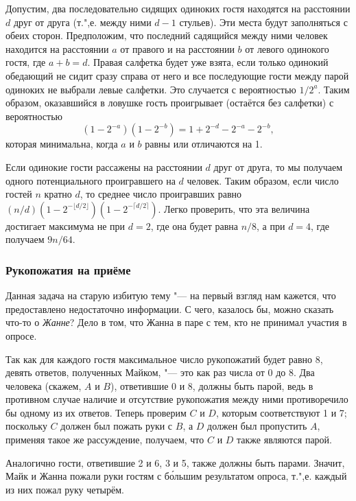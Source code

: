 \documentclass[twoside]{book}
\begin{document}
Допустим, два последовательно сидящих одиноких гостя находятся на расстоянии $d$ друг от друга (т.",е. между ними $d-1$ стульев).
Эти места будут заполняться с обеих сторон.
Предположим, что последний садящийся между ними человек находится на расстоянии $a$ от правого и на расстоянии $b$ от левого одинокого гостя, где $a+b=d$.
Правая салфетка будет уже взята, если только одинокий обедающий не сидит сразу справа от него и все последующие гости между парой одиноких не выбрали левые салфетки.
Это случается с вероятностью $1/2^a$.
Таким образом, оказавшийся в ловушке 
гость проигрывает (остаётся без салфетки) с вероятностью
\[(1-2^{-a})(1-2^{-b})=1 + 2^{-d}-2^{-a}-2^{-b},\]
которая минимальна, когда $a$ и $b$ равны или отличаются на 1.

Если одинокие гости рассажены на расстоянии $d$ друг от друга, то мы получаем одного потенциального проигравшего на $d$ человек.
Таким образом, если число гостей $n$ кратно $d$, то среднее число проигравших равно $(n/d)(1-2^{-\lfloor d/2\rfloor})(1-2^{-\lceil d/2\rceil})$.
Легко проверить, что эта величина достигает максимума не при $d=2$, где она будет равна $n/8$, а при $d=4$, где получаем $9n/64$.
\heart

\subsubsection*{Рукопожатия на приёме}%

Данная задача на старую избитую тему "--- на первый взгляд нам кажется, что предоставлено недостаточно информации.
С чего, казалось бы, можно сказать что-то о \emph{Жанне}?
Дело в том, что Жанна в паре с тем, кто не принимал участия в опросе.

Так как для каждого гостя максимальное число рукопожатий будет равно 8, 
девять ответов, полученных Майком, "--- это как раз числа от 0 до 8.
Два человека (скажем, $A$ и $B$), ответившие 0 и 8, должны быть парой, ведь в противном случае наличие и отсутствие рукопожатия между ними противоречило бы одному из их ответов.
Теперь проверим $C$ и $D$, которым соответствуют 1 и 7;
поскольку $C$ должен был пожать руки с $B$, а $D$ должен был пропустить $A$, применяя такое же рассуждение, получаем, что $C$ и $D$ также являются парой.

Аналогично гости, ответившие 2 и 6, 3 и 5,
также должны быть парами.  Значит, Майк и Жанна пожали руки гостям с
б\'{о}льшим результатом опроса, т.",е. каждый из них пожал руку
четырём.  \heart
\end{document}

